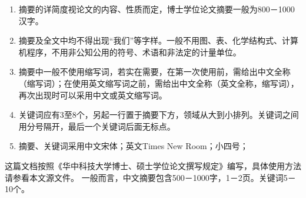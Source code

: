 {\begin{enumerate}
\begin{enumerate}
        \item 结论：结果的分析、研究、比较、评价、应用；提出的问题，今后的课题，建议，预测等。
        \item 其他：不属于研究、研制、调查的主要目的，但就其见识和情报价值而言也是重要的信息。
    \end{enumerate}
    \item 摘要的详简度视论文的内容、性质而定，博士学位论文摘要一般为800－1000汉字。
    \item 摘要及全文中均不得出现“我们”等字样。一般不用图、表、化学结构式、计算机程序，不用非公知公用的符号、术语和非法定的计量单位。
    \item 摘要中一般不使用缩写词，若实在需要，在第一次使用前，需给出中文全称（缩写词）；在使用英文缩写词之前，需给出中文全称（英文全称，缩写词），再次出现时可以采用中文或英文缩写词。
    \item 关键词应有3至8个，另起一行置于摘要下方，领域从大到小排列。关键词之间用分号隔开，最后一个关键词后面无标点。
    \item 摘要、关键词采用中文宋体；英文Times New Room；小四号；
\end{enumerate}

这篇文档按照《华中科技大学博士、硕士学位论文撰写规定》编写，具体使用方法请参看本文源文件。
一般而言，中文摘要包含500－1000字，1－2页。关键词5－10个。}



